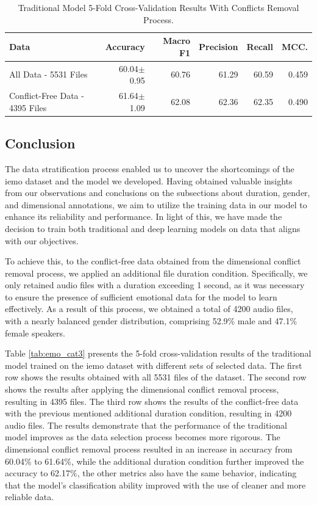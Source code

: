 \begin{table}[H]
	\small
	\centering
	\caption{Traditional Model 5-Fold Cross-Validation Results With Conflicts Removal Process.}
	\label{tab:emo_cat2}
	\centering
	\begin{tabular}{lrrrrr}
		\toprule
		Data   						 	& Accuracy    & Macro F1    & Precision   & Recall      & MCC.       \\
		\midrule
		All Data - 5531 Files		 	& 60.04$\pm$0.95 & 60.76 & 61.29 & 60.59 & 0.459 \\
		Conflict-Free Data - 4395 Files & 61.64$\pm$1.09 & 62.08 & 62.36 & 62.35 & 0.490 \\
		\bottomrule
	\end{tabular}
\end{table}


\subsection{Conclusion}

The data stratification process enabled us to uncover the shortcomings of the \ac{iemo} dataset and the model we developed. Having obtained valuable insights from our observations and conclusions on the subsections about duration, gender, and dimensional annotations, we aim to utilize the training data in our model to enhance its reliability and performance. In light of this, we have made the decision to train both traditional and deep learning models on data that aligns with our objectives.

To achieve this, to the conflict-free data obtained from the dimensional conflict removal process, we applied an additional file duration condition. Specifically, we only retained audio files with a duration exceeding 1 second, as it was necessary to ensure the presence of sufficient emotional data for the model to learn effectively. As a result of this process, we obtained a total of 4200 audio files, with a nearly balanced gender distribution, comprising 52.9\% male and 47.1\% female speakers.

Table \ref{tab:emo_cat3} presents the 5-fold cross-validation results of the traditional model trained on the \ac{iemo} dataset with different sets of selected data. The first row shows the results obtained with all 5531 files of the dataset. The second row shows the results after applying the dimensional conflict removal process, resulting in 4395 files. The third row shows the results of the conflict-free data with the previous mentioned additional duration condition, resulting in 4200 audio files. The results demonstrate that the performance of the traditional model improves as the data selection process becomes more rigorous. The dimensional conflict removal process resulted in an increase in accuracy from 60.04\% to 61.64\%, while the additional duration condition further improved the accuracy to 62.17\%, the other metrics also have the same behavior, indicating that the model's classification ability improved with the use of cleaner and more reliable data.

